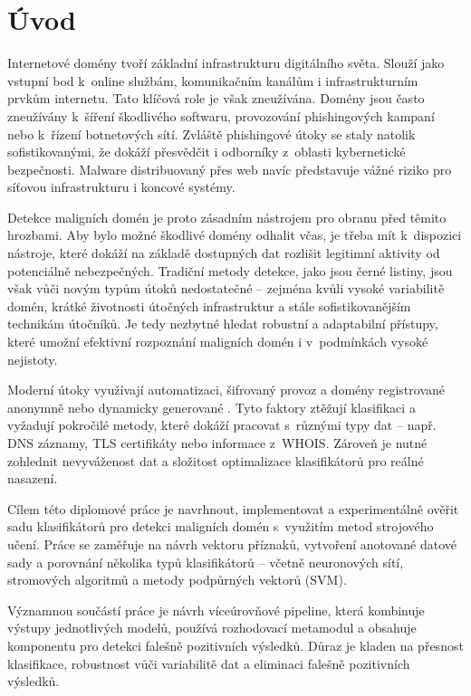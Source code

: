 


\chapter{Úvod}

Internetové domény tvoří základní infrastrukturu digitálního světa. Slouží jako vstupní bod k~online službám, komunikačním kanálům i infrastrukturním prvkům internetu. Tato klíčová role je však zneužívána. Domény jsou často zneužívány k~šíření škodlivého softwaru, provozování phishingových kampaní nebo k~řízení botnetových sítí. Zvláště phishingové útoky se staly natolik sofistikovanými, že dokáží přesvědčit i odborníky z~oblasti kybernetické bezpečnosti. Malware distribuovaný přes web navíc představuje vážné riziko pro síťovou infrastrukturu i koncové systémy.

Detekce maligních domén je proto zásadním nástrojem pro obranu před těmito hrozbami. Aby bylo možné škodlivé domény odhalit včas, je třeba mít k~dispozici nástroje, které dokáží na základě dostupných dat rozlišit legitimní aktivity od potenciálně nebezpečných. Tradiční metody detekce, jako jsou černé listiny, jsou však vůči novým typům útoků nedostatečné – zejména kvůli vysoké variabilitě domén, krátké životnosti útočných infrastruktur a stále sofistikovanějším technikám útočníků. Je tedy nezbytné hledat robustní a adaptabilní přístupy, které umožní efektivní rozpoznání maligních domén i v~podmínkách vysoké nejistoty.

Moderní útoky využívají automatizaci, šifrovaný provoz a domény registrované anonymně nebo dynamicky generované . Tyto faktory ztěžují klasifikaci a vyžadují pokročilé metody, které dokáží pracovat s~různými typy dat – např. DNS záznamy, TLS certifikáty nebo informace z~WHOIS. Zároveň je nutné zohlednit nevyváženost dat a složitost optimalizace klasifikátorů pro reálné nasazení.

Cílem této diplomové práce je navrhnout, implementovat a experimentálně ověřit sadu klasifikátorů pro detekci maligních domén s~využitím metod strojového učení. Práce se zaměřuje na návrh vektoru příznaků, vytvoření anotované datové sady a porovnání několika typů klasifikátorů – včetně neuronových sítí, stromových algoritmů a metody podpůrných vektorů (SVM).

Významnou součástí práce je návrh víceúrovňové pipeline, která kombinuje výstupy jednotlivých modelů, používá rozhodovací metamodul a obsahuje komponentu pro detekci falešně pozitivních výsledků. Důraz je kladen na přesnost klasifikace, robustnost vůči variabilitě dat a eliminaci falešně pozitivních výsledků.


